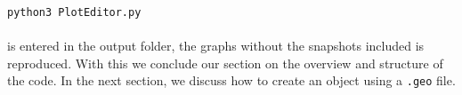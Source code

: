 \noindent \texttt{python3 PlotEditor.py}\\
\\
is entered in the output folder, the graphs without the snapshots included is reproduced. With this we conclude our section on the overview and structure of the code. In the next section, we discuss how to create an object using a \texttt{.geo} file.\\





















